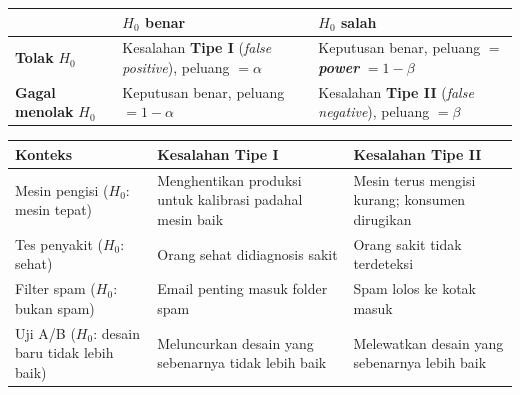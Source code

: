 \documentclass[
  indonesian,
  letterpaper,
]{book}
\newcounter{none} %
\begin{document}
{\def\LTcaptype{none} %
\begin{longtable}[]{@{}
  >{\raggedright\arraybackslash}p{}
  >{\raggedright\arraybackslash}p{}
  >{\raggedright\arraybackslash}p{}@{}}
\toprule\noalign{}
\begin{minipage}[b]{\linewidth}\raggedright
\end{minipage} & \begin{minipage}[b]{\linewidth}\raggedright
\textbf{\(H_0\) benar}
\end{minipage} & \begin{minipage}[b]{\linewidth}\raggedright
\textbf{\(H_0\) salah}
\end{minipage} \\
\midrule\noalign{}
\endhead
\bottomrule\noalign{}
\endlastfoot
\textbf{Tolak} \(H_0\) & Kesalahan \textbf{Tipe I} (\emph{false
positive}), peluang \(= \alpha\) & Keputusan benar, peluang \(=\)
\textbf{\emph{power}} \(= 1 - \beta\) \\
\textbf{Gagal menolak} \(H_0\) & Keputusan benar, peluang
\(= 1 - \alpha\) & Kesalahan \textbf{Tipe II} (\emph{false negative}),
peluang \(= \beta\) \\
\end{longtable}
}

{\def\LTcaptype{none} %
\begin{longtable}[]{@{}
  >{\raggedright\arraybackslash}p{}
  >{\raggedright\arraybackslash}p{}
  >{\raggedright\arraybackslash}p{}@{}}
\toprule\noalign{}
\begin{minipage}[b]{\linewidth}\raggedright
Konteks
\end{minipage} & \begin{minipage}[b]{\linewidth}\raggedright
Kesalahan Tipe I
\end{minipage} & \begin{minipage}[b]{\linewidth}\raggedright
Kesalahan Tipe II
\end{minipage} \\
\midrule\noalign{}
\endhead
\bottomrule\noalign{}
\endlastfoot
Mesin pengisi (\(H_0\): mesin tepat) & Menghentikan produksi untuk
kalibrasi padahal mesin baik & Mesin terus mengisi kurang; konsumen
dirugikan \\
Tes penyakit (\(H_0\): sehat) & Orang sehat didiagnosis sakit & Orang
sakit tidak terdeteksi \\
Filter spam (\(H_0\): bukan spam) & Email penting masuk folder spam &
Spam lolos ke kotak masuk \\
Uji A/B (\(H_0\): desain baru tidak lebih baik) & Meluncurkan desain
yang sebenarnya tidak lebih baik & Melewatkan desain yang sebenarnya
lebih baik \\
\end{longtable}
}
\end{document}
